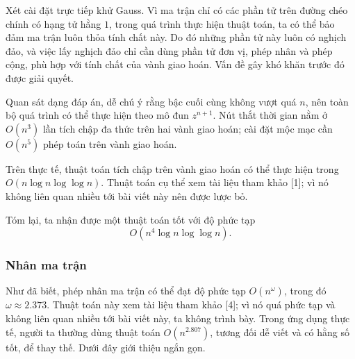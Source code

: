 \documentclass[11pt]{article}
\begin{document}
Xét cài đặt trực tiếp khử Gauss. Vì ma trận chỉ có các phần tử trên đường chéo
chính có hạng tử hằng \(1\), trong quá trình thực hiện thuật toán, ta có thể bảo
đảm ma trận luôn thỏa tính chất này. Do đó những phần tử này luôn có nghịch đảo,
và việc lấy nghịch đảo chỉ cần dùng phần tử đơn vị, phép nhân và phép cộng, phù
hợp với tính chất của vành giao hoán. Vấn đề gây khó khăn trước đó được giải
quyết.

Quan sát dạng đáp án, dễ chú ý rằng bậc cuối cùng không vượt quá \(n\), nên toàn
bộ quá trình có thể thực hiện theo mô đun \(z^{n+1}\). Nút thắt thời gian nằm ở
\(O(n^3)\) lần tích chập đa thức trên hai vành giao hoán; cài đặt mộc mạc cần
\(O(n^5)\) phép toán trên vành giao hoán.

Trên thực tế, thuật toán tích chập trên vành giao hoán có thể thực hiện trong
\(O(n\log n\log\log n)\). Thuật toán cụ thể xem tài liệu tham khảo [1]; vì nó
không liên quan nhiều tới bài viết này nên được lược bỏ.

Tóm lại, ta nhận được một thuật toán tốt với độ phức tạp
\[
  O(n^4\log n\log\log n).
\]

\subsubsection{Nhân ma trận}

Như đã biết, phép nhân ma trận có thể đạt độ phức tạp \(O(n^\omega)\), trong đó
\(\omega\approx 2.373\). Thuật toán này xem tài liệu tham khảo [4]; vì nó quá
phức tạp và không liên quan nhiều tới bài viết này, ta không trình bày. Trong
ứng dụng thực tế, người ta thường dùng thuật toán \(O(n^{2.807})\), tương đối dễ
viết và có hằng số tốt, để thay thế. Dưới đây giới thiệu ngắn gọn.
\end{document}
